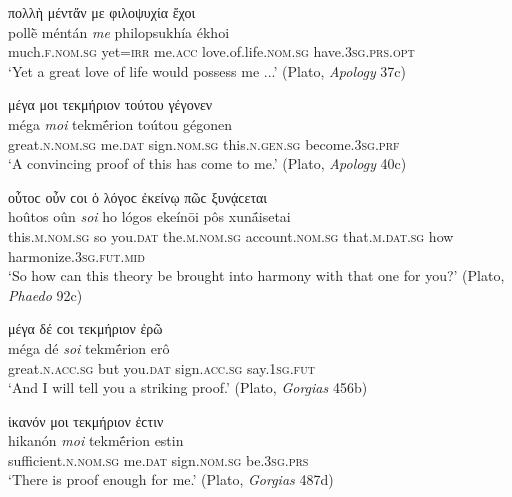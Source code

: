 \begin{exe}
\ex πολλὴ μέντἄν με φιλοψυχία ἔχοι\\
\gll pollḕ méntán \emph{me} philopsukhía ékhoi\\
much.\textsc{f.nom.sg} yet=\textsc{irr} me.\textsc{acc}
love.of.life\textsc{.nom.sg} have.\textsc{3sg.prs.opt}\\
\trans `Yet a great love of life would possess me ...' (Plato, \textit{Apology} 37c)
\label{attsep18}
\end{exe}

\begin{exe}
\ex μέγα μοι τεκμήριον τούτου γέγονεν\\
\gll méga \emph{moi} tekmḗrion toútou gégonen\\
great.\textsc{n.nom.sg} me.\textsc{dat} sign.\textsc{nom.sg}
this.\textsc{n.gen.sg} become.\textsc{3sg.prf}\\
\trans `A convincing proof of this has come to me.' (Plato, \textit{Apology} 40c)
\label{attsep19}
\end{exe}

\begin{exe}
\ex οὗτοϲ οὖν ϲοι ὁ λόγοϲ ἐκείνῳ πῶϲ ξυνᾴϲεται\\
\gll hoûtos oûn \emph{soi} ho lógos ekeínōi pôs xunā́isetai\\
this.\textsc{m.nom.sg} so you.\textsc{dat} the.\textsc{m.nom.sg}
account.\textsc{nom.sg} that.\textsc{m.dat.sg} how harmonize.\textsc{3sg.fut.mid}\\
\trans `So how can this theory be brought into harmony with that one for you?' (Plato, \textit{Phaedo} 92c)
\label{attsep20}
\end{exe}

\begin{exe}
\ex μέγα δέ ϲοι τεκμήριον ἐρῶ\\
\gll méga dé \emph{soi} tekmḗrion erô\\
great.\textsc{n.acc.sg} but you.\textsc{dat} sign.\textsc{acc.sg} say.\textsc{1sg.fut}\\
\trans `And I will tell you a striking proof.' (Plato, \textit{Gorgias} 456b)
\label{attsep21}
\end{exe}

\begin{exe}
\ex ἱκανόν μοι τεκμήριον ἐϲτιν\\
\gll hikanón \emph{moi} tekmḗrion estin\\
sufficient.\textsc{n.nom.sg} me.\textsc{dat} sign.\textsc{nom.sg}
be.\textsc{3sg.prs}\\
\trans `There is proof enough for me.' (Plato, \textit{Gorgias} 487d)
\label{attsep22}
\end{exe}

